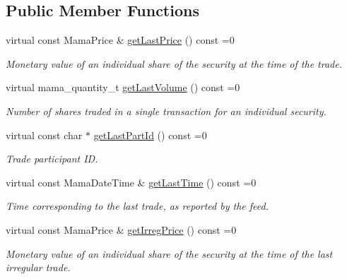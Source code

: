 \subsection*{Public Member Functions}
\begin{CompactItemize}
\item 
virtual const Mama\-Price \& \hyperlink{classWombat_1_1MamdaTradeRecap_24a18014e43ec6df41a6405e3b2e0b03}{get\-Last\-Price} () const =0
\begin{CompactList}\small\item\em Monetary value of an individual share of the security at the time of the trade. \item\end{CompactList}\item 
virtual mama\_\-quantity\_\-t \hyperlink{classWombat_1_1MamdaTradeRecap_095f2490ee5cb36624d26e34bf01547b}{get\-Last\-Volume} () const =0
\begin{CompactList}\small\item\em Number of shares traded in a single transaction for an individual security. \item\end{CompactList}\item 
virtual const char $\ast$ \hyperlink{classWombat_1_1MamdaTradeRecap_67a37388f66bd17d38a51e72c09d9549}{get\-Last\-Part\-Id} () const =0
\begin{CompactList}\small\item\em Trade participant ID. \item\end{CompactList}\item 
virtual const Mama\-Date\-Time \& \hyperlink{classWombat_1_1MamdaTradeRecap_b589580af79ac95e51a3055014c99d2e}{get\-Last\-Time} () const =0
\begin{CompactList}\small\item\em Time corresponding to the last trade, as reported by the feed. \item\end{CompactList}\item 
virtual const Mama\-Price \& \hyperlink{classWombat_1_1MamdaTradeRecap_5d274713697f09773b0bf6c5c30c637d}{get\-Irreg\-Price} () const =0
\begin{CompactList}\small\item\em Monetary value of an individual share of the security at the time of the last irregular trade. \item\end{CompactList}\item 

\end{CompactItemize}
